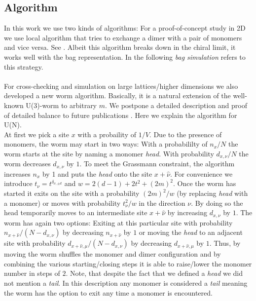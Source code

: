 \documentclass{PoS}
\begin{document}
\subsection{Algorithm}

In this work we use two kinds of algorithms: For a proof-of-concept study in 2D we use local algorithm that tries to exchange a dimer with a pair of monomers and vice versa. See \cite{Karsch:1988zx}. Albeit this algorithm breaks down in the chiral limit, it works well with the bag representation. In the following \textit{bag simulation} refers to this strategy.\\
\\For cross-checking and simulation on large lattices/higher dimensions we also developed a new worm algorithm. Basically, it is a natural extension of the well-known U(3)-worm \cite{Adams:2003cca} to arbitrary $m$. We postpone a detailed description and proof of detailed balance to future publications \cite{Orasch:2019_1, Orasch:2019_2}. Here we explain the algorithm for U(N).\\
At first we pick a site $x$ with a probaility of $1/V$. Due to the presence of monomers, the worm may start in two ways: With a probabililty of $n_x/N$ the worm starts at the site by naming a monomer \textit{head}. With probability $d_{x,\nu}/N$ the worm decreases $d_{x,\nu}$ by $1$. To meet the Grassmann constraint, the algorithm increases $n_x$ by 1 and puts the \textit{head} onto the site $x+\hat{\nu}$. For convenience we introduce $t_{\nu} = t^{\delta_{\nu,\pm d}}$ and $w = 2(d-1) + 2t^2 + (2m)^2$. Once the worm has started it exits on the site with a probability $(2m)^2/w$ (by replacing \textit{head} with a monomer) or moves with probability $t^2_{\nu}/w$ in the direction $\nu$. By doing so the head temporarily moves to an intermediate site $x+\hat{\nu}$ by increasing $d_{x,\nu}$ by $1$. The worm has again two options: Exiting at this particular site with probability $n_{x+\hat{\nu}}/(N-d_{x,\nu})$ by decreasing $n_{x+\hat{\nu}}$ by $1$ or moving the \textit{head} to an adjacent site with probability $d_{x+\hat{\nu}, \mu}/(N-d_{x,\nu})$ by decreasing $d_{x+\hat{\nu}, \mu}$ by $1$. Thus, by moving the worm shuffles the monomer and dimer configuration and by combining the various starting/closing steps it is able to raise/lower the monomer number in steps of $2$. Note, that despite the fact that we defined a \textit{head} we did not mention a \textit{tail}. In this description any monomer is considered a \textit{tail} meaning the worm has the option to exit any time a monomer is encountered.\\
\end{document}
